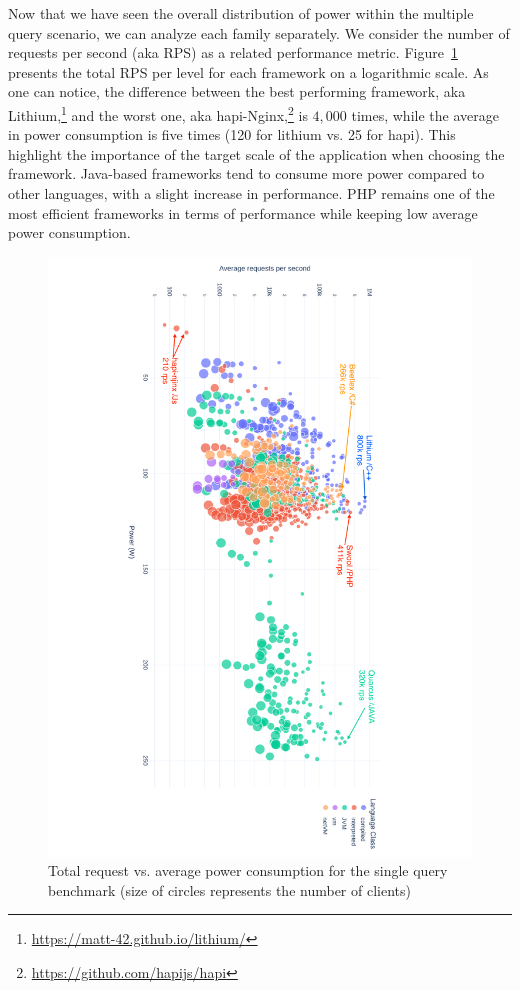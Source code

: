 Now that we have seen the overall distribution of power within the multiple query scenario, we can analyze each family separately.
We consider the number of requests per second (aka RPS) as a related performance metric.
Figure~\ref{fig:power_requests_query} presents the total RPS per level for each framework on a logarithmic scale.
As one can notice, the difference between the best performing framework, aka Lithium,\footnote{\url{https://matt-42.github.io/lithium/}} and the worst one, aka hapi-Nginx,\footnote{\url{https://github.com/hapijs/hapi}} is $4,000$ times, while the average in power consumption is five times (120 for lithium vs. 25 for hapi).
This highlight the importance of the target scale of the application when choosing the framework.
Java-based frameworks tend to consume more power compared to other languages, with a slight increase in performance.
PHP remains one of the most efficient frameworks in terms of performance while keeping low average power consumption.

\begin{figure}[hbt]
    \includegraphics[height=\textwidth,width=\textheight,keepaspectratio,angle=90]{imgs/power_requests_query_log}
    \caption{Total request vs. average power consumption for the single query benchmark (size of circles represents the number of clients) }
    \label{fig:power_requests_query}
\end{figure}


